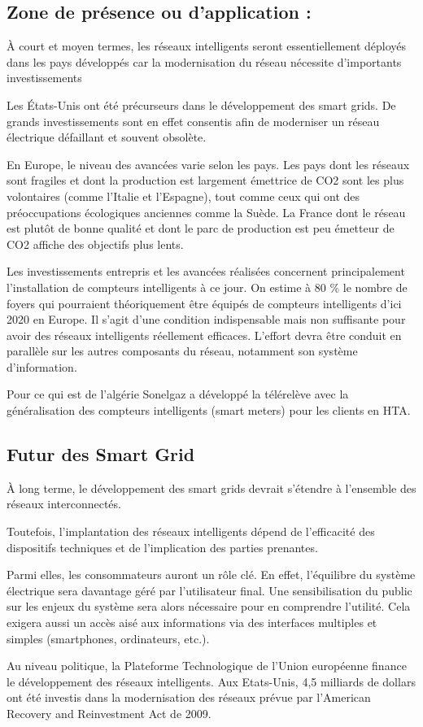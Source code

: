 \subsection{Zone de présence ou d'application :}
À court et moyen termes, les réseaux intelligents seront essentiellement déployés dans les pays développés car la modernisation du réseau nécessite d’importants investissements 

Les États-Unis ont été précurseurs dans le développement des smart grids. De grands investissements sont en effet consentis afin de moderniser un réseau électrique défaillant et souvent obsolète.

En Europe, le niveau des avancées varie selon les pays. Les pays dont les réseaux sont fragiles et dont la production est largement émettrice de CO2 sont les plus volontaires (comme l’Italie et l’Espagne), tout comme ceux qui ont des préoccupations écologiques anciennes comme la Suède. La France dont le réseau est plutôt de bonne qualité et dont le parc de production est peu émetteur de CO2 affiche des objectifs plus lents.

Les investissements entrepris et les avancées réalisées concernent principalement l’installation de compteurs intelligents à ce jour. On estime à 80 \% le nombre de foyers qui pourraient théoriquement être équipés de compteurs intelligents d’ici 2020 en Europe. Il s’agit d’une condition indispensable mais non suffisante pour avoir des réseaux intelligents réellement efficaces. L’effort devra être conduit en parallèle sur les autres composants du réseau, notamment son système d’information.

Pour ce qui est de l'algérie Sonelgaz a développé la télérelève avec la généralisation des compteurs intelligents (smart meters) pour les clients en HTA.

\subsection{Futur des Smart Grid}
À long terme, le développement des smart grids devrait s’étendre à l’ensemble des réseaux interconnectés.

Toutefois, l’implantation des réseaux intelligents dépend de l’efficacité des dispositifs techniques et de l’implication des parties prenantes.

Parmi elles, les consommateurs auront un rôle clé. En effet, l’équilibre du système électrique sera davantage géré par l’utilisateur final. Une sensibilisation du public sur les enjeux du système sera alors nécessaire pour en comprendre l’utilité. Cela exigera aussi un accès aisé aux informations via des interfaces multiples et simples (smartphones, ordinateurs, etc.).

Au niveau politique, la Plateforme Technologique de l’Union européenne finance le développement des réseaux intelligents. Aux Etats-Unis, 4,5 milliards de dollars ont été investis dans la modernisation des réseaux prévue par l’American Recovery and Reinvestment Act de 2009.